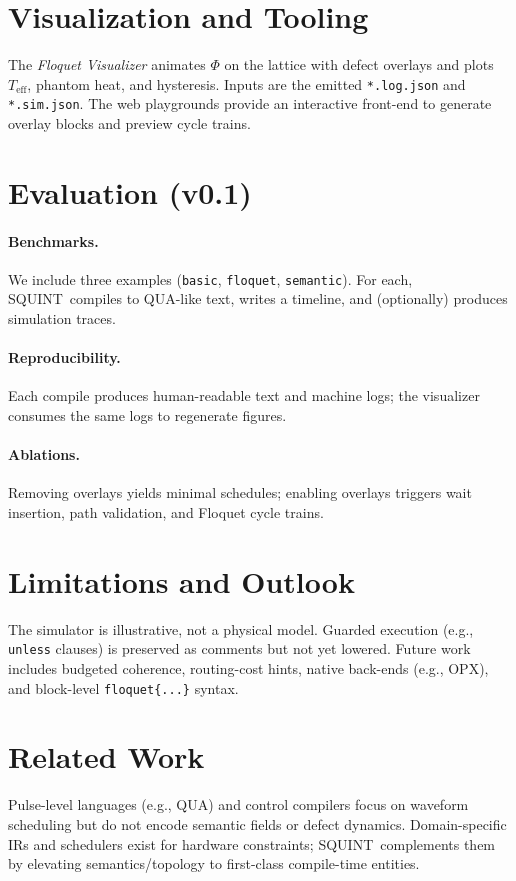 \documentclass[11pt]{article}
\newcommand{\Teff}{T_{\mathrm{eff}}}
\newcommand{\Phif}{\Phi}
\newcommand{\SQUINT}{\textsc{SQUINT}}
\newcommand{\qua}{\textsc{QUA}}
\begin{document}
\section{Visualization and Tooling}
\label{sec:viz}
The \emph{Floquet Visualizer} animates $\Phif$ on the lattice with defect overlays and plots $\Teff$, phantom heat, and hysteresis. Inputs are the emitted \verb|*.log.json| and \verb|*.sim.json|. The web playgrounds provide an interactive front-end to generate overlay blocks and preview cycle trains.

\section{Evaluation (v0.1)}
\label{sec:evaluation}
\paragraph{Benchmarks.} We include three examples (\texttt{basic}, \texttt{floquet}, \texttt{semantic}). For each, \SQUINT\ compiles to QUA-like text, writes a timeline, and (optionally) produces simulation traces.
\paragraph{Reproducibility.} Each compile produces human-readable text and machine logs; the visualizer consumes the same logs to regenerate figures.
\paragraph{Ablations.} Removing overlays yields minimal schedules; enabling overlays triggers wait insertion, path validation, and Floquet cycle trains.

\section{Limitations and Outlook}
\label{sec:limits}
The simulator is illustrative, not a physical model. Guarded execution (e.g., \texttt{unless} clauses) is preserved as comments but not yet lowered. Future work includes budgeted coherence, routing-cost hints, native back-ends (e.g., OPX), and block-level \texttt{floquet\{...\}} syntax.

\section{Related Work}
\label{sec:related}
Pulse-level languages (e.g., \qua) and control compilers focus on waveform scheduling but do not encode semantic fields or defect dynamics. Domain-specific IRs and schedulers exist for hardware constraints; \SQUINT\ complements them by elevating semantics/topology to first-class compile-time entities.
\end{document}
